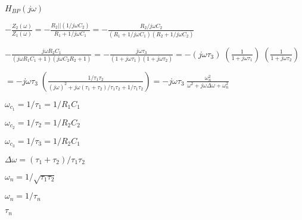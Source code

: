 \documentclass{article}
\def\lthtmlcheckvsize{\ifdim\ht\sizebox<\vsize 
  \ifdim\wd\sizebox<\hsize\expandafter\hfill\fi \expandafter\vfill
  \else\expandafter\vss\fi}%
\begin{document}
{\newpage\clearpage
{}%
$\displaystyle H_{BP}(j\omega)$%
\lthtmlindisplaymathZ
\lthtmlcheckvsize\clearpage}

{\newpage\clearpage
{}%
$\displaystyle -\frac{Z_2(\omega)}{Z_1(\omega)}
=-\frac{R_2||(1/j\omega C_2)}{R_1+1/j\omega C_1}
=-\frac{R_2/j\omega C_2}{(R_1+1/j\omega C_1)(R_2+1/j\omega C_2)}$%
\lthtmlindisplaymathZ
\lthtmlcheckvsize\clearpage}

{\newpage\clearpage
{}%
$\displaystyle -\frac{j\omega R_2C_1}{(j\omega R_1C_1+1)(j\omega C_2R_2+1)}
=-\frac{j\omega \tau_3}{(1+j\omega \tau_1)(1+j\omega \tau_2)}
=-\left(j\omega\tau_3\right)\;\left(\frac{1}{1+j\omega\tau_1}\right)
\;\left(\frac{1}{1+j\omega\tau_2}\right)$%
\lthtmlindisplaymathZ
\lthtmlcheckvsize\clearpage}

{\newpage\clearpage
{}%
$\displaystyle =-j\omega\tau_3\;
\left(\frac{1/\tau_1\tau_2}{(j\omega)^2+j\omega(\tau_1+\tau_2)/\tau_1\tau_2+1/\tau_1\tau_2}\right)
=-j\omega\tau_3\;\frac{\omega_n^2}{\omega^2+j\omega\Delta\omega+\omega_n^2}$%
\lthtmlindisplaymathZ
\lthtmlcheckvsize\clearpage}

{\newpage\clearpage
{}%
$\omega_{c_1}=1/\tau_1=1/R_1C_1$%
\lthtmlindisplaymathZ
\lthtmlcheckvsize\clearpage}

{\newpage\clearpage
{}%
$\omega_{c_2}=1/\tau_2=1/R_2C_2$%
\lthtmlindisplaymathZ
\lthtmlcheckvsize\clearpage}

{\newpage\clearpage
{}%
$\omega_{c_3}=1/\tau_3=1/R_2C_1$%
\lthtmlindisplaymathZ
\lthtmlcheckvsize\clearpage}

{\newpage\clearpage
{}%
$\Delta\omega=(\tau_1+\tau_2)/\tau_1\tau_2$%
\lthtmlindisplaymathZ
\lthtmlcheckvsize\clearpage}

{\newpage\clearpage
{}%
$\omega_n=1/\sqrt{\tau_1\tau_2}$%
\lthtmlindisplaymathZ
\lthtmlcheckvsize\clearpage}

{\newpage\clearpage
{}%
$\omega_n=1/\tau_n$%
\lthtmlindisplaymathZ
\lthtmlcheckvsize\clearpage}

{\newpage\clearpage
{}%
$\tau_n$%
\lthtmlindisplaymathZ
\lthtmlcheckvsize\clearpage}
\end{document}
